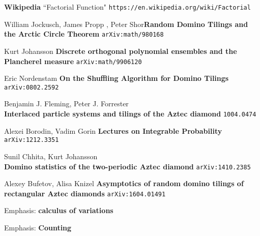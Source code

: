 \documentclass[12pt]{article}
\begin{document}
\begin{thebibliography}{}

\item \textbf{Wikipedia} ``Factorial Function" \texttt{https://en.wikipedia.org/wiki/Factorial}

\item William Jockusch, James Propp , Peter Shor\textbf{Random Domino Tilings and the Arctic Circle Theorem} \texttt{arXiv:math/980168}

\item Kurt Johansson \textbf{Discrete orthogonal polynomial ensembles and the Plancherel measure} \texttt{arXiv:math/9906120}

\item Eric Nordenstam \textbf{On the Shuffling Algorithm for Domino Tilings} \texttt{arXiv:0802.2592}

\item Benjamin J. Fleming, Peter J. Forrester \\ \textbf{Interlaced particle systems and tilings of the Aztec diamond} \texttt{1004.0474}

\item Alexei Borodin, Vadim Gorin \textbf{Lectures on Integrable Probability} \texttt{arXiv:1212.3351}

\item Sunil Chhita, Kurt Johansson \\ \textbf{Domino statistics of the two-periodic Aztec diamond} \texttt{arXiv:1410.2385}

\item Alexey Bufetov, Alisa Knizel \textbf{Asymptotics of random domino tilings of rectangular Aztec diamonds} \texttt{arXiv:1604.01491}

\end{thebibliography}

\selectfont \fontsize{20}{25}\selectfont

\noindent Emphasis:  \textbf{calculus of variations}


\selectfont \fontsize{12}{10}\selectfont

\begin{thebibliography}{}

\item 

\end{thebibliography}

\selectfont \fontsize{20}{25}\selectfont

\noindent Emphasis:  \textbf{Counting}
\end{document}
